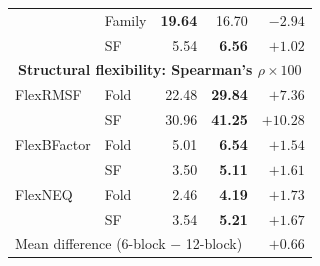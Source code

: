 \begin{table}[htbp]
\begin{tabular}{@{}llrrr@{}}
 & Family & \textbf{19.64} & 16.70 & $-2.94$ \\
 & SF & 5.54 & \textbf{6.56} & $+1.02$ \\
\midrule
\multicolumn{5}{c}{\textbf{Structural flexibility: Spearman's $\rho\times100$}} \\
\midrule
FlexRMSF & Fold & 22.48 & \textbf{29.84} & $+7.36$ \\
 & SF & 30.96 & \textbf{41.25} & $+10.28$ \\
FlexBFactor & Fold & 5.01 & \textbf{6.54} & $+1.54$ \\
 & SF & 3.50 & \textbf{5.11} & $+1.61$ \\
FlexNEQ & Fold & 2.46 & \textbf{4.19} & $+1.73$ \\
 & SF & 3.54 & \textbf{5.21} & $+1.67$ \\
\midrule
\multicolumn{4}{l}{Mean difference (6-block $-$ 12-block)} & $+0.66$ \\
\bottomrule
\end{tabular}
\end{table}
\clearpage
